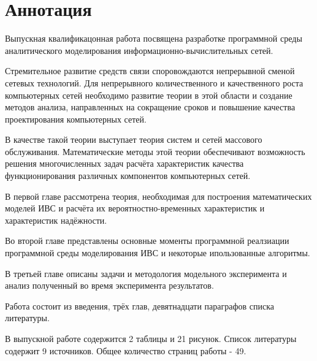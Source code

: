\documentclass[oneside, final, 14pt, a4paper]{extreport}
\begin{document}

\chapter*{\centering Аннотация}
Выпускная квалификацонная работа посвящена разработке программной среды аналитического моделирования информационно-вычислительных сетей.

Стремительное развитие средств связи споровождаются непрерывной сменой сетевых технологий. Для непрерывного количественного и качественного роста компьютерных сетей необходимо развитие теории в этой области и создание методов анализа, направленных на сокращение сроков и повышение качества проектирования компьютерных сетей.

В качестве такой теории выступает теория систем и сетей массового обслуживания.
Математические методы этой теории обеспечивают возможность решения многочисленных задач расчёта
характеристик качества функционирования различных компонентов компьютерных сетей.

В первой главе рассмотрена теория, необходимая для построения математических моделей ИВС и расчёта их вероятностно-временных характеристик и характеристик надёжности.

Во второй главе представлены основные моменты программной реалзиации программной среды моделирования ИВС и некоторые ипользованные алгоритмы.

В третьей главе описаны задачи и методология модельного эксперимента и анализ полученный во время эксперимента результатов.

Работа состоит из введения, трёх глав, девятнадцати параграфов списка литературы.

В выпускной работе содержится 2 таблицы и 21 рисунок. Список литературы содержит 9 источников. Общее количество страниц работы - 49.
\end{document}
